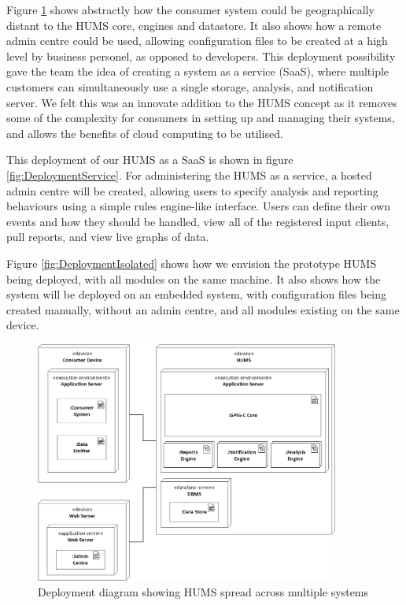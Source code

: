 \documentclass[10pt,a4paper]{article}
\begin{document}
Figure \ref{fig:DeploymentDistributed} shows abstractly how the consumer system could be geographically distant to the HUMS core, engines and datastore. It also shows how a remote admin centre could be used, allowing configuration files to be created at a high level by business personel, as opposed to developers. This deployment possibility gave the team the idea of creating a system as a service (SaaS), where multiple customers can simultaneously use a single storage, analysis, and notification server. We felt this was an innovate addition to the HUMS concept as it removes some of the complexity for consumers in setting up and managing their systems, and allows the benefits of cloud computing to be utilised.

This deployment of our HUMS as a SaaS is shown in figure \ref{fig:DeploymentService}. For administering the HUMS as a service, a hosted admin centre will be created, allowing users to specify analysis and reporting behaviours using a simple rules engine-like interface. Users can define their own events and how they should be handled, view all of the registered input clients, pull reports, and view live graphs of data.

Figure \ref{fig:DeploymentIsolated} shows how we envision the prototype HUMS being deployed, with all modules on the same machine. It also shows how the system will be deployed on an embedded system, with configuration files being created manually, without an admin centre, and all modules existing on the same device.
\begin{figure}[!ht]
  \centering
  \includegraphics[width=10cm]{images/DeploymentDistributed.png}
  \caption{Deployment diagram showing HUMS spread across multiple 
systems}
  \label{fig:DeploymentDistributed}
\end{figure}
\end{document}
